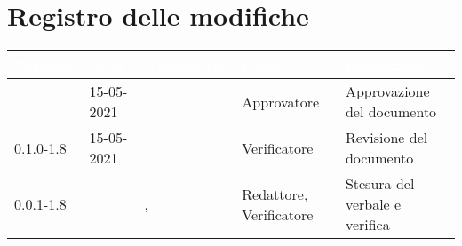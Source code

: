 \section*{Registro delle modifiche}
{
\setcounter{table}{-1}
{
\renewcommand{\arraystretch}{1.5}
\centering
\begin{longtable}{C{2cm} | C{2.5cm} | C{3.5cm} | C{2.7cm} | C{4.2cm}}
\textcolor{white}{\textbf{Versione}}&
\textcolor{white}{\textbf{Data}}&
\textcolor{white}{\textbf{Nominativo}}&
\textcolor{white}{\textbf{Ruolo}}&
\textcolor{white}{\textbf{Descrizione}}\\	
\endhead
		
\Versionedoc{} & 15-05-2021 & \Approvatore{} & Approvatore & Approvazione del documento\\
0.1.0-1.8 & 15-05-2021 & \PA{} & Verificatore & Revisione del documento\\
0.0.1-1.8 & \Data{} & \Redattori{}, \ZM{} & Redattore, Verificatore & Stesura del verbale e verifica\\
		
\end{longtable}
}
}
